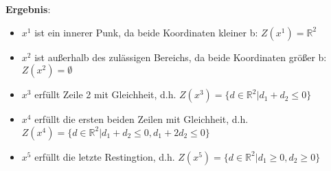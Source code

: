 \documentclass[12pt,a4paper, hyperref]{article}
\begin{document}
\textbf{Ergebnis}:
\begin{itemize}
\item $x^1$ ist ein innerer Punk, da beide Koordinaten kleiner b: $Z(x^1) = \mathbb{R}^2$
\item $x^2$ ist außerhalb des zulässigen Bereichs, da beide Koordinaten größer b: $Z(x^2) = \emptyset$
\item $x^3$ erfüllt Zeile 2 mit Gleichheit, d.h. $Z(x^3) = \{d \in \mathbb{R}^2 | d_1 + d_2 \leq 0 \}$
\item $x^4$ erfüllt die ersten beiden Zeilen mit Gleichheit, d.h. $Z(x^4) = \{d \in \mathbb{R}^2 | d_1 +d_2 \leq 0 , d_1 + 2d_2 \leq 0 \}$
\item $x^5$ erfüllt die letzte Restingtion, d.h. $Z(x^5) = \{d \in \mathbb{R}^2 | d_1 \geq 0, d_2 \geq 0 \}$
\end{itemize}
\end{document}
